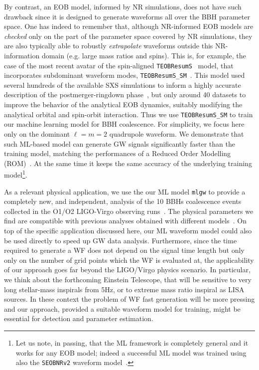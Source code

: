 By contrast, an EOB model, informed by NR simulations, does not have such drawback 
since it is designed to generate waveforms all over the BBH parameter space. 
One has indeed to remember that, although NR-informed EOB models are {\it checked} 
only on the part of the parameter space covered by NR simulations, 
they are also typically able to robustly {\it extrapolate} waveforms 
outside this NR-information domain (e.g. large mass ratios and
spins).
%
%
This is, for example, the case of the most  recent avatar of 
the spin-aligned \texttt{TEOBResumS}~\cite{Nagar:2018zoe} model, 
that incorporates subdominant waveform modes,  \texttt{TEOBResumS\_SM}~\cite{Nagar:2019wds,Nagar:2020pcj}. 
This model used several hundreds of the available SXS simulations to inform a highly accurate description 
of the postmerger-ringdown phase~\cite{Damour:2014yha}, but 
only around 40 datasets to improve the behavior of the analytical EOB dynamics, 
suitably modifying the analytical orbital and spin-orbit interaction.
Thus we use \texttt{TEOBResumS\_SM} to train our machine learning 
model for BBH coalescence. For simplicity, we focus here only on the 
dominant $\ell=m=2$ quadrupole waveform. 
We demonstrate that such ML-based model can generate 
GW signals significantly faster than the training model, 
matching the performances of a Reduced Order Modelling 
(ROM)~\cite{Purrer:2015tud,Bohe:2016gbl,Purrer:2017str}.  
At the same time it keeps the same accuracy of the underlying 
training model\footnote{Let us note, in passing, that the ML framework 
is completely general and it works for any EOB model; indeed 
a successful ML model was trained using also the \texttt{SEOBNRv2} 
waveform model~\cite{Taracchini:2013rva}. }.

As a relevant physical application, we use the our ML model \texttt{mlgw} 
to provide a completely new, and independent, analysis of the 10 BBHs 
coalescence events collected in the O1/O2 LIGO-Virgo observing 
runs~\cite{LIGOScientific:2018mvr}. The physical parameters we find are 
compatible with previous analyses obtained with different 
models~\cite{LIGOScientific:2018mvr}.
%
On top of the specific application discussed here, our ML waveform model could also be used directly 
to speed up GW data analysis.
Furthermore, since the time required to generate a WF does not depend
on the signal time length but only only on the number of grid points which the WF is evaluated at,
the applicability of our approach goes far beyond the LIGO/Virgo physics scenario. In particular,
we think about the forthcoming Einstein Telescope, that will be sensitive to very long stellar-mass 
inspirals from 5Hz, or to extreme mass ratio inspiral as LISA sources. In these context the problem
of WF fast generation will be more pressing and our approach, provided a suitable waveform model 
for training,  might be essential for detection and parameter estimation. 

